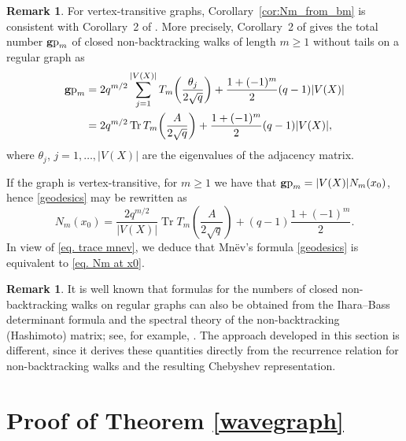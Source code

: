 \documentclass[reqno,10pt]{amsart}
\theoremstyle{definition}
\newtheorem{remark}[theorem]{Remark}
\numberwithin{equation}{section}
\begin{document}
\begin{remark}
For vertex-transitive graphs, Corollary~\ref{cor:Nm_from_bm} is consistent
with Corollary~2 of \cite{Mn07}. More precisely, Corollary~2 of \cite{Mn07} gives the total number $\operatorname{\textbf gp}_m$ of closed non-backtracking walks of length $m\ge 1$ without tails on a regular graph as
\begin{equation}\label{geodesics}
\begin{split}
\operatorname{\textbf gp}_m
&=
2q^{m/2}
\sum_{j=1}^{|V(X)|}
T_m\!\left(\frac{\theta_j}{2\sqrt q}\right)
+
\frac{1+(-1)^m}{2}(q-1)|V(X)|\\
&=2q^{m/2}\operatorname{Tr}
T_m\!\left(\frac{A}{2\sqrt q}\right)+
\frac{1+(-1)^m}{2}(q-1)|V(X)|,
\end{split}
\end{equation}
where $\theta_j$, $j=1,\ldots, |V(X)|$ are the eigenvalues of the adjacency matrix.

If the graph is vertex-transitive, for $m\ge 1$ we have that $\operatorname{\textbf gp}_m= |V(X)| N_m(x_0)$, hence \eqref{geodesics} may be rewritten as
\begin{equation*}\label{eq. N0 as trace}
N_m(x_0)
=
\frac{2q^{m/2}}{|V(X)|}
\operatorname{Tr}
T_m\!\left(\frac{A}{2\sqrt q}\right)
+
(q-1)\frac{1+(-1)^m}{2}.
\end{equation*}
In view of \eqref{eq. trace mnev}, we deduce that Mn\"ev's formula \eqref{geodesics} is equivalent to \eqref{eq. Nm at x0}.
\end{remark}

\begin{remark}
It is well known that formulas for the numbers of closed non-backtracking walks on regular graphs can also be obtained from the
Ihara--Bass determinant formula and the spectral theory of the
non-backtracking (Hashimoto) matrix; see, for example,
\cite{AFH15, FP23, GK21}. The approach developed in this section is different,
since it derives these quantities directly from the recurrence relation for non-backtracking walks and the resulting Chebyshev representation.
\end{remark}

\section{Proof of Theorem \ref{wavegraph}} \label{sec. proof main thm}
\end{document}
